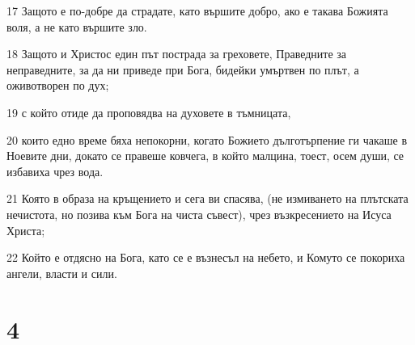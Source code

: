 \par 17 Защото е по-добре да страдате, като вършите добро, ако е такава Божията воля, а не като вършите зло.
\par 18 Защото и Христос един път пострада за греховете, Праведните за неправедните, за да ни приведе при Бога, бидейки умъртвен по плът, а оживотворен по дух;
\par 19 с който отиде да проповядва на духовете в тъмницата,
\par 20 които едно време бяха непокорни, когато Божието дълготърпение ги чакаше в Ноевите дни, докато се правеше ковчега, в който малцина, тоест, осем души, се избавиха чрез вода.
\par 21 Която в образа на кръщението и сега ви спасява, (не измиването на плътската нечистота, но позива към Бога на чиста съвест), чрез възкресението на Исуса Христа;
\par 22 Който е отдясно на Бога, като се е възнесъл на небето, и Комуто се покориха ангели, власти и сили.

\chapter{4}

